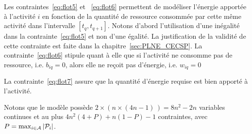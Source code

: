 Les contraintes~\eqref{eq:flot5} et ~\eqref{eq:flot6} permettent de
modéliser l’énergie apportée à l’activité $i$ en fonction de la
quantité de ressource consommée par cette même activité dans
l’intervalle $[t_q , t_{q+1}]$. Notons d’abord l’utilisation d’une
inégalité dans la contrainte~\eqref{eq:flot5} et non d’une égalité. La
justification de la validité de cette contrainte est faite dans la
chapitre~\ref{sec:PLNE_CECSP}. La contrainte~\eqref{eq:flot6}
stipule quant à elle que si l'activité ne consomme pas de ressource,
i.e. $b_{iq}=0$, alors elle ne reçoit pas d'énergie, i.e. $w_{iq}=0$

La contrainte~\eqref{eq:flot7} assure que la quantité d'énergie
requise est bien apporté à l'activité. 

Notons que le modèle possède $2 \times (n \times (4n - 1)\,) = 8n^2 -
2n$ variables continues et au plus $4n^2(4+P) + n (1 -
P) - 1$ contraintes, avec $P=\max_{i\in{\cal A}}|{\cal P}_i|$.

